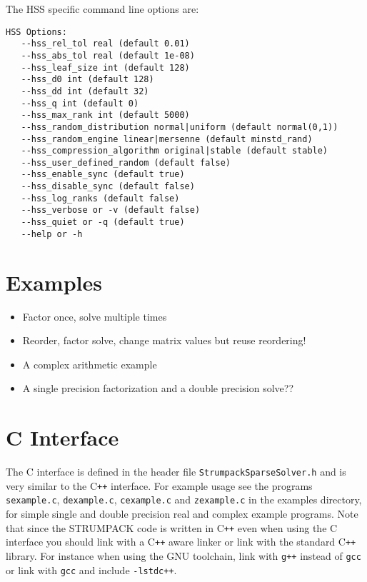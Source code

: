 \documentclass{article}
\begin{document}
The HSS specific command line options are:
\begin{lstlisting}[style=Bash]
 HSS Options:
   --hss_rel_tol real (default 0.01)
   --hss_abs_tol real (default 1e-08)
   --hss_leaf_size int (default 128)
   --hss_d0 int (default 128)
   --hss_dd int (default 32)
   --hss_q int (default 0)
   --hss_max_rank int (default 5000)
   --hss_random_distribution normal|uniform (default normal(0,1))
   --hss_random_engine linear|mersenne (default minstd_rand)
   --hss_compression_algorithm original|stable (default stable)
   --hss_user_defined_random (default false)
   --hss_enable_sync (default true)
   --hss_disable_sync (default false)
   --hss_log_ranks (default false)
   --hss_verbose or -v (default false)
   --hss_quiet or -q (default true)
   --help or -h
\end{lstlisting}


\section{Examples}\label{sec:examples}


\begin{itemize}
\item Factor once, solve multiple times
\item Reorder, factor solve, change matrix values but reuse reordering!
\item A complex arithmetic example
\item A single precision factorization and a double precision solve??
\end{itemize}

\section{C Interface} \label{sec:Cinterface} The C interface is
defined in the header file
\lstinline[style=C]!StrumpackSparseSolver.h! and is very similar to
the C\texttt{++} interface. For example usage see the programs
\lstinline[style=C]!sexample.c!, \lstinline[style=C]!dexample.c!,
\lstinline[style=C]!cexample.c! and \lstinline[style=C]!zexample.c!
in the examples directory, for simple single and double precision real
and complex example programs. Note that since the STRUMPACK code is
written in C\texttt{++} even when using the C interface you should
link with a C\texttt{++} aware linker or link with the standard
C\texttt{++} library. For instance when using the GNU toolchain, link
with \texttt{g++} instead of \texttt{gcc} or link with \texttt{gcc}
and include \texttt{-lstdc++}.
\end{document}
